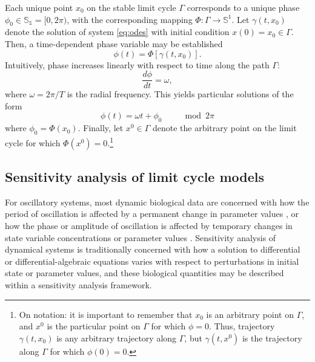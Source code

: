 Each unique point $x_0$ on the stable limit cycle $\Gamma$ corresponds to a unique phase $\phi_0 \in\mathbb{S_1}=[0,2\pi)$, with the corresponding mapping $\Phi : \Gamma \to \mathbb{S}^1$.
Let $\gamma(t,x_0)$ denote the solution of system \eqref{eq:odes} with initial condition $x(0)=x_0\in\Gamma$.
Then, a time-dependent phase variable may be established
\begin{equation}
\phi(t) = \Phi[\gamma(t,x_0)].
\end{equation}
Intuitively, phase increases linearly with respect to time along the path $\Gamma$: 
\begin{equation}
    \frac{d\phi}{dt} = \omega,
\end{equation}
where $\omega = 2\pi/T$ is the radial frequency.
This yields particular solutions of the form
\begin{equation}
    \phi(t) = \omega t +\phi_0 \qquad \mod 2\pi
\end{equation}
where $\phi_0 = \Phi(x_0)$. 
Finally, let $x^0 \in\Gamma$ denote the arbitrary point on the limit cycle for which $\Phi(x^0) = 0$.\footnote{On notation: it is important to remember that $x_0$ is an arbitrary point on $\Gamma$, and $x^0$ is the particular point on $\Gamma$ for which $\phi=0$. Thus, trajectory $\gamma(t,x_0)$ is any arbitrary trajectory along $\Gamma$, but $\gamma(t,x^0)$ is the trajectory along $\Gamma$ for which $\phi(0)=0$.}

\subsection*{Sensitivity analysis of limit cycle models \label{sec:32}}

For oscillatory systems, most dynamic biological data are concerned with how the period of oscillation is affected by a permanent change in parameter values \cite{Zhang2009, Hirota2012a}, or how the phase or amplitude of oscillation is affected by temporary changes in state variable concentrations or parameter values \cite{Pittendrigh1976, Jewett1999, Vitaterna2006, Comas2006}.
Sensitivity analysis of dynamical systems is traditionally concerned with how a solution to differential or differential-algebraic equations varies with respect to perturbations in initial state or parameter values, and these biological quantities may be described within a sensitivity analysis framework.


